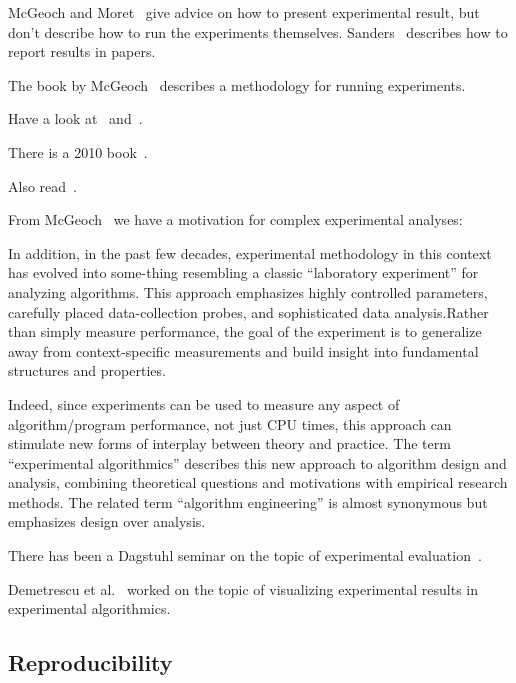 \documentclass{llncs}
\begin{document}
McGeoch and Moret~\cite{DBLP:journals/sigact/McGeochM99} give advice on how
to present experimental result, but don't describe how to run the experiments
themselves.
Sanders~\cite{DBLP:conf/dagstuhl/Sanders00} describes how to report results
in papers.

The book by McGeoch~\cite{DBLP:reference/algo/McGeoch08} describes a methodology
for running experiments.

Have a look at~\cite{DBLP:journals/jucs/MoretS01} and~\cite{DBLP:conf/dimacs/Moret99}.

There is a 2010 book~\cite{DBLP:books/sp/2010BCPP}.

Also read~\cite{DBLP:series/ncs/Bartz-BeielsteinP14}.

From McGeoch~\cite{DBLP:journals/cacm/McGeoch07} we have a motivation for complex
experimental analyses:
\begin{center}
\begin{minipage}{0.8\textwidth}
  In addition, in the past few decades, experimental methodology in this
  context has evolved into some-thing resembling a classic “laboratory
  experiment” for analyzing algorithms. This approach emphasizes highly
  controlled parameters, carefully placed data-collection probes, and
  sophisticated data analysis.Rather than simply measure performance, the
  goal of the experiment is to generalize away from context-specific
  measurements and build insight into fundamental structures and properties.

  Indeed, since experiments can be used to measure any aspect of
  algorithm/program performance, not just CPU times, this approach can
  stimulate new forms of interplay between theory and practice. The term
  “experimental algorithmics” describes this new approach to algorithm design
  and analysis, combining theoretical questions and motivations with
  empirical research methods. The related term “algorithm engineering” is
  almost synonymous but emphasizes design over analysis.
\end{minipage}
\end{center}

There has been a Dagstuhl seminar on the topic of 
experimental evaluation~\cite{DBLP:conf/dagstuhl/2000ea}.

Demetrescu et al.~\cite{DBLP:conf/dagstuhl/DemetrescuFIN00} worked on
the topic of visualizing experimental results in experimental algorithmics.

\subsection{Reproducibility}
\end{document}
